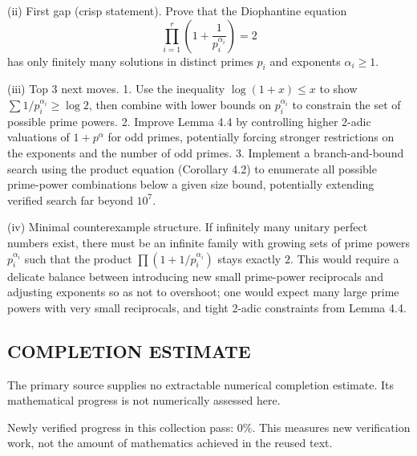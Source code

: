 (ii) First gap (crisp statement).
Prove that the Diophantine equation
\[
  \prod_{i=1}^r \left(1+\frac{1}{p_i^{\alpha_i}}\right)=2
\]
has only finitely many solutions in distinct primes $p_i$ and exponents $\alpha_i\ge 1$.

(iii) Top 3 next moves.
1. Use the inequality $\log(1+x)\le x$ to show
   $\sum 1/p_i^{\alpha_i} \ge \log 2$, then combine with lower bounds on $p_i^{\alpha_i}$
   to constrain the set of possible prime powers.
2. Improve Lemma 4.4 by controlling higher 2-adic valuations of $1+p^\alpha$ for odd primes,
   potentially forcing stronger restrictions on the exponents and the number of odd primes.
3. Implement a branch-and-bound search using the product equation (Corollary 4.2) to enumerate all
   possible prime-power combinations below a given size bound, potentially extending verified search
   far beyond $10^7$.

(iv) Minimal counterexample structure.
If infinitely many unitary perfect numbers exist, there must be an infinite family with growing sets
of prime powers $p_i^{\alpha_i}$ such that the product $\prod(1+1/p_i^{\alpha_i})$ stays exactly $2$.
This would require a delicate balance between introducing new small prime-power reciprocals and
adjusting exponents so as not to overshoot; one would expect many large prime powers with very small
reciprocals, and tight 2-adic constraints from Lemma 4.4.



\subsection*{COMPLETION ESTIMATE}
The primary source supplies no extractable numerical completion estimate. Its mathematical progress is not numerically assessed here.

Newly verified progress in this collection pass: $0\%$. This measures new verification work, not the amount of mathematics achieved in the reused text.
